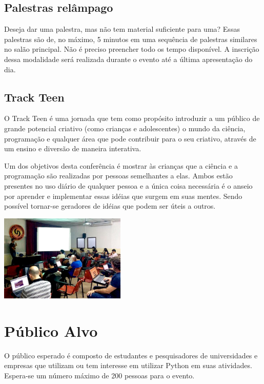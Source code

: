 \documentclass[report,a4paper,twocolumn]{memoir}
\begin{document}
\section*{Palestras relâmpago}

Deseja dar uma palestra, mas não tem material suficiente para uma? Essas palestras são de, no máximo, 5 minutos em uma sequência de palestras similares no salão principal. Não é preciso preencher todo os tempo disponível. A inscrição dessa modalidade será realizada durante o evento até a última apresentação do dia.

\section*{Track Teen}

O Track Teen é uma jornada que tem como propósito introduzir a um público de grande potencial criativo (como crianças e adolescentes) o mundo da ciência, programação e qualquer área que pode contribuir para o seu criativo, através de um ensino e diversão de maneira interativa. 

Um dos objetivos desta conferência é mostrar às crianças que a ciência e a programação são realizadas por pessoas semelhantes a elas. Ambos estão presentes no uso diário de qualquer pessoa e a única coisa necessária é o anseio por aprender e implementar essas idéias que surgem em suas mentes. Sendo possível tornar-se geradores de idéias que podem ser úteis a outros.

\begin{center}
\includegraphics[width=6cm]{imagens/CFc8POiWYAEcPAV-small.jpg}
\end{center}

\chapter*{Público Alvo}

O público esperado é composto de estudantes e pesquisadores de universidades e empresas que utilizam ou tem interesse em utilizar Python em suas atividades. Espera-se um número máximo de 200 pessoas para o evento.
\end{document}
